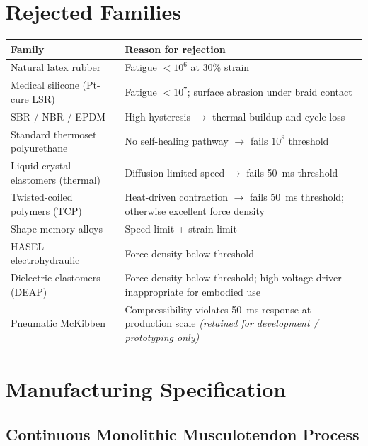 \documentclass[11pt, a4paper]{article}
\begin{document}
\section{Rejected Families}

\begin{center}
\begin{tabular}{@{}lp{8cm}@{}}
\toprule
\textbf{Family} & \textbf{Reason for rejection} \\
\midrule
Natural latex rubber & Fatigue $<10^6$ at 30\% strain \\
Medical silicone (Pt-cure LSR) & Fatigue $<10^7$; surface
  abrasion under braid contact \\
SBR / NBR / EPDM & High hysteresis $\to$ thermal buildup and
  cycle loss \\
Standard thermoset polyurethane & No self-healing pathway $\to$
  fails $10^8$ threshold \\
Liquid crystal elastomers (thermal) & Diffusion-limited speed
  $\to$ fails 50~ms threshold \\
Twisted-coiled polymers (TCP) & Heat-driven contraction $\to$
  fails 50~ms threshold; otherwise excellent force density \\
Shape memory alloys & Speed limit + strain limit \\
HASEL electrohydraulic & Force density below threshold \\
Dielectric elastomers (DEAP) & Force density below threshold;
  high-voltage driver inappropriate for embodied use \\
Pneumatic McKibben & Compressibility violates 50~ms response
  at production scale \textit{(retained for development /
  prototyping only)} \\
\bottomrule
\end{tabular}
\end{center}

\section{Manufacturing Specification}

\subsection{Continuous Monolithic Musculotendon Process}
\end{document}
